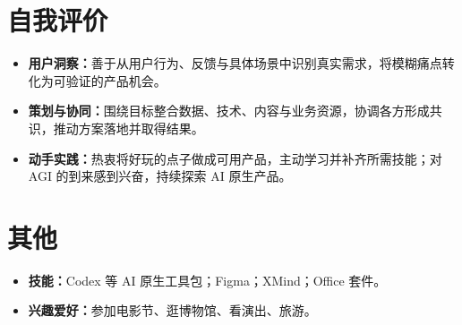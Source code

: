 \documentclass[9pt,a4paper]{article}
\newcommand{\tagitem}[2]{\item \textbf{#1：}#2}
\begin{document}
\section{自我评价}
\begin{itemize}
  \tagitem{用户洞察}{善于从用户行为、反馈与具体场景中识别真实需求，将模糊痛点转化为可验证的产品机会。}
  \tagitem{策划与协同}{围绕目标整合数据、技术、内容与业务资源，协调各方形成共识，推动方案落地并取得结果。}
  \tagitem{动手实践}{热衷将好玩的点子做成可用产品，主动学习并补齐所需技能；对 AGI 的到来感到兴奋，持续探索 AI 原生产品。}
\end{itemize}

\section{其他}
\begin{itemize}
  \tagitem{技能}{Codex 等 AI 原生工具包；Figma；XMind；Office 套件。}
  \tagitem{兴趣爱好}{参加电影节、逛博物馆、看演出、旅游。}
\end{itemize}
\end{document}
